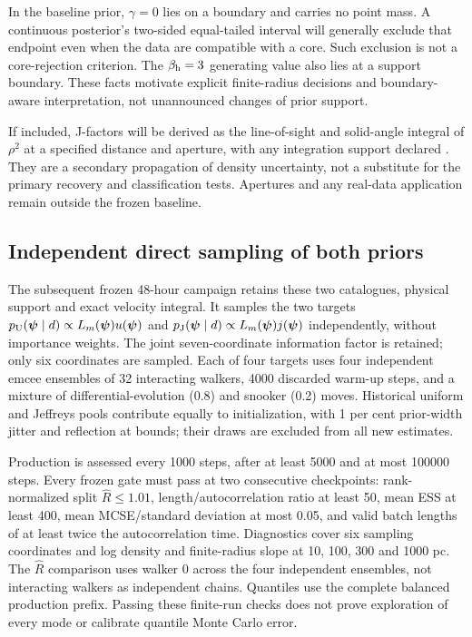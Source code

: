 In the baseline prior, $\gamma=0$ lies on a boundary and carries no point mass. A continuous posterior's two-sided equal-tailed interval will generally exclude that endpoint even when the data are compatible with a core. Such exclusion is not a core-rejection criterion. The $\beta_{\rm h}=3$ generating value also lies at a support boundary. These facts motivate explicit finite-radius decisions and boundary-aware interpretation, not unannounced changes of prior support.

If included, J-factors will be derived as the line-of-sight and solid-angle integral of $\rho^2$ at a specified distance and aperture, with any integration support declared \citep{evans2016}. They are a secondary propagation of density uncertainty, not a substitute for the primary recovery and classification tests. Apertures and any real-data application remain outside the frozen baseline.

\subsection{Independent direct sampling of both priors}
\label{sec:direct}
The subsequent frozen 48-hour campaign retains these two catalogues, physical support and exact velocity integral. It samples the two targets $p_{\rm U}(\boldsymbol\psi\mid d)\propto L_m(\boldsymbol\psi)u(\boldsymbol\psi)$ and $p_{\rm J}(\boldsymbol\psi\mid d)\propto L_m(\boldsymbol\psi)j(\boldsymbol\psi)$ independently, without importance weights. The joint seven-coordinate information factor is retained; only six coordinates are sampled. Each of four targets uses four independent emcee ensembles of 32 interacting walkers, 4000 discarded warm-up steps, and a mixture of differential-evolution (0.8) and snooker (0.2) moves. Historical uniform and Jeffreys pools contribute equally to initialization, with 1 per cent prior-width jitter and reflection at bounds; their draws are excluded from all new estimates.

Production is assessed every 1000 steps, after at least 5000 and at most 100000 steps. Every frozen gate must pass at two consecutive checkpoints: rank-normalized split $\widehat R\leq1.01$, length/autocorrelation ratio at least 50, mean ESS at least 400, mean MCSE/standard deviation at most 0.05, and valid batch lengths of at least twice the autocorrelation time. Diagnostics cover six sampling coordinates and log density and finite-radius slope at 10, 100, 300 and 1000 pc. The $\widehat R$ comparison uses walker 0 across the four independent ensembles, not interacting walkers as independent chains. Quantiles use the complete balanced production prefix. Passing these finite-run checks does not prove exploration of every mode or calibrate quantile Monte Carlo error.

